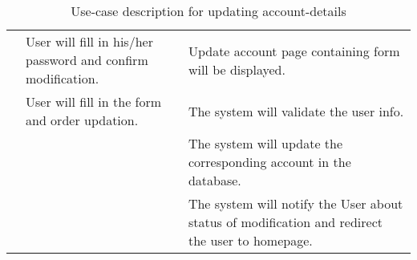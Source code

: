 \begin{table}[H]
\begin{center}
\begin{tabularx}{\linewidth}{ | l | X | X | }
		& User will fill in his/her password and confirm modification. & Update account page containing form will be displayed. \\
		&  User will fill in the form and order updation. & The system will validate the user info. \\
		& & The system will update the corresponding account in the database. \\
		& & The system will notify the User about status of modification and redirect the user to homepage. \\
	\hline
	\end{tabularx}
	\caption{Use-case description for updating account-details }
\end{center}
\end{table}




